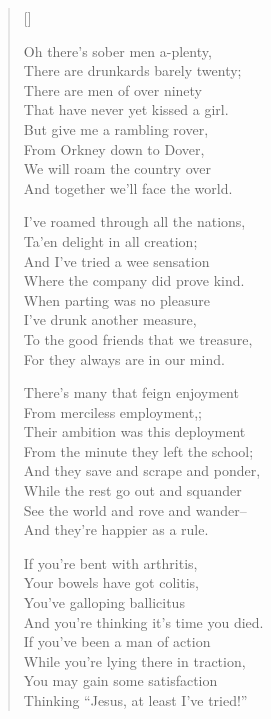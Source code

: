 \pagebreak
\settowidth{\versewidth}{That have never yet kissed a girl.}
\begin{verse}[\versewidth]
\\
\begin{chorus}
Oh there's sober men a-plenty,\\
There are drunkards barely twenty;\\
There are men of over ninety\\
That have never yet kissed a girl.\\
But give me a rambling rover,\\
From Orkney down to Dover,\\
We will roam the country over\\
And together we'll face the world.
\end{chorus}


I've roamed through all the nations,\\
Ta'en delight in all creation;\\
And I've tried a wee sensation\\
Where the company did prove kind.\\
When parting was no pleasure\\
I've drunk another measure,\\
To the good friends that we treasure,\\
For they always are in our mind.


There's many that feign enjoyment\\
From merciless employment,;\\
Their ambition was this deployment\\
From the minute they left the school;\\
And they save and scrape and ponder,\\
While the rest go out and squander\\
See the world and rove and wander--\\
And they're happier as a rule.


If you're bent with arthritis,\\
Your bowels have got colitis,\\
You've galloping ballicitus\\
And you're thinking it's time you died.\\
If you've been a man of action\\
While you're lying there in traction,\\
You may gain some satisfaction\\
Thinking ``Jesus, at least I've tried!''\\

\end{verse}
